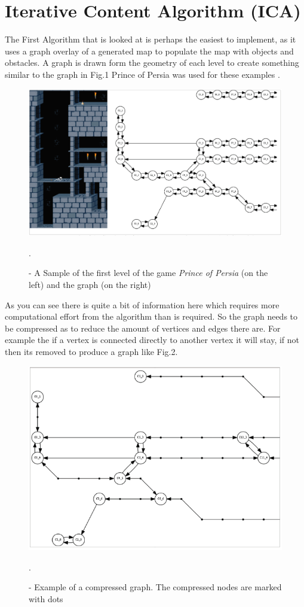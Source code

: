 \documentclass{scrartcl}
\begin{document}
\section{Iterative Content Algorithm (ICA)}

The First Algorithm that is looked at is perhaps the easiest to implement, as it uses a graph overlay of a generated map to populate the map with objects and obstacles. A graph is drawn form the geometry of each level to create something similar to the graph in Fig.1 Prince of Persia was used for these examples \cite{fausto}.
\newline
\newline
\begin{figure}[h]
	\centering
	\includegraphics[width=0.7\linewidth]{Fig1}
	\caption{ - A Sample of the first level of the game \textit{Prince of Persia} (on the left) and the graph (on the right)}.
	\label{Fig1}
\end{figure}\cite{fausto}


As you can see there is quite a bit of information here which requires more computational effort from the algorithm than is required. So the graph needs to be compressed as to reduce the amount of vertices and edges there are. For example the if a vertex is connected directly to another vertex it will stay, if not then its removed to produce a graph like Fig.2\cite{fausto}.
\newline
\newline
\newline
\newline
\newline
\newline
\begin{figure}[h]
	\centering
	\includegraphics[width=0.7\linewidth]{Fig2}
	\caption{ - Example of a compressed graph. The compressed nodes are marked with dots}.
	\label{Fig2}
\end{figure}\cite{fausto}
\end{document}
